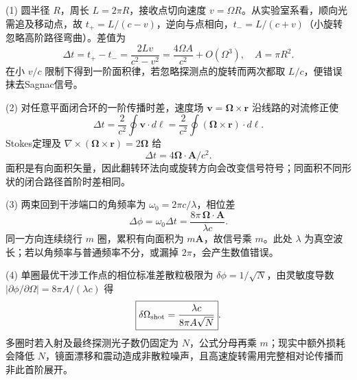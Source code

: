 (1) 圆半径 \(R\)，周长 \(L=2\pi R\)，接收点切向速度 \(v=\Omega R\)。从实验室系看，顺向光需追及移动点，故 \(t_+=L/(c-v)\)，逆向与点相向，\(t_-=L/(c+v)\)（小旋转忽略高阶路径弯曲）。差值为
\[
\Delta t=t_+-t_-=\frac{2Lv}{c^2-v^2}
=\frac{4\Omega A}{c^2}+O(\Omega^3),\quad A=\pi R^2.
\]
在小 \(v/c\) 限制下得到一阶面积律，若忽略探测点的旋转而两次都取 \(L/c\)，便错误抹去Sagnac信号。

(2) 对任意平面闭合环的一阶传播时差，速度场 \(\boldsymbol v=\boldsymbol\Omega\times\boldsymbol r\) 沿线路的对流修正使
\[
\Delta t=\frac2{c^2}\oint\boldsymbol v\cdot d\boldsymbol\ell
=\frac2{c^2}\oint(\boldsymbol\Omega\times\boldsymbol r)\cdot d\boldsymbol\ell.
\]
Stokes定理及 \(\nabla\times(\boldsymbol\Omega\times\boldsymbol r)=2\boldsymbol\Omega\) 给
\[
\boxed{\Delta t=4\boldsymbol\Omega\cdot\boldsymbol A/c^2}.
\]
面积是有向面积矢量，因此翻转环法向或旋转方向会改变信号符号；同面积不同形状的闭合路径首阶时差相同。

(3) 两束回到干涉端口的角频率为 \(\omega_0=2\pi c/\lambda\)，相位差
\[
\boxed{\Delta\phi=\omega_0\Delta t
=\frac{8\pi\,\boldsymbol\Omega\cdot\boldsymbol A}{\lambda c}}.
\]
同一方向连续绕行 \(m\) 圈，累积有向面积为 \(m\boldsymbol A\)，故信号乘 \(m\)。此处 \(\lambda\) 为真空波长；若以角频率与普通频率不分，或漏掉 \(2\pi\)，会产生数值错误。

(4) 单圈最优干涉工作点的相位标准差散粒极限为 \(\delta\phi=1/\sqrt N\)，由灵敏度导数 \(|\partial\phi/\partial\Omega|=8\pi A/(\lambda c)\) 得
\[
\boxed{\delta\Omega_{\rm shot}=\frac{\lambda c}{8\pi A\sqrt N}}.
\]
多圈时若入射及最终探测光子数仍固定为 \(N\)，公式分母再乘 \(m\)；现实中额外损耗会降低 \(N\)，镜面漂移和震动造成非散粒噪声，且高速旋转需用完整相对论传播而非此首阶展开。
